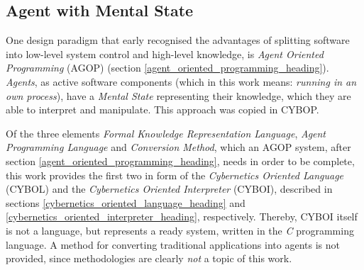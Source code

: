 %
%
%
%
%
%
%

\subsection{Agent with Mental State}
\label{agent_with_mental_state_heading}

One design paradigm that early recognised the advantages of splitting software
into low-level system control and high-level knowledge, is
\emph{Agent Oriented Programming} (AGOP) (section
\ref{agent_oriented_programming_heading}). \emph{Agents}, as active software
components (which in this work means: \emph{running in an own process}), have
a \emph{Mental State} representing their knowledge, which they are able to
interpret and manipulate. This approach was copied in CYBOP.

Of the three elements \emph{Formal Knowledge Representation Language},
\emph{Agent Programming Language} and \emph{Conversion Method}, which an AGOP
system, after section \ref{agent_oriented_programming_heading}, needs in order
to be complete, this work provides the first two in form of the
\emph{Cybernetics Oriented Language} (CYBOL) and the
\emph{Cybernetics Oriented Interpreter} (CYBOI), described in sections
\ref{cybernetics_oriented_language_heading} and
\ref{cybernetics_oriented_interpreter_heading}, respectively. Thereby, CYBOI
itself is not a language, but represents a ready system, written in the
\emph{C} programming language. A method for converting traditional applications
into agents is not provided, since methodologies are clearly \emph{not} a topic
of this work.

